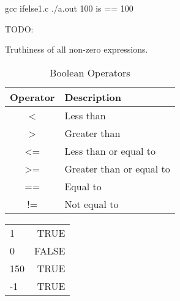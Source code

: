 \begin{Terminal}
gcc ifelse1.c
./a.out
100 is == 100
\end{Terminal}


TODO:

Truthiness of all non-zero expressions.

\begin{table}
\centering
\begin{tabular}{|c|l|}
\hline
Operator & Description \\
\hline
\textless & Less than \\
\textgreater & Greater than \\
\textless= & Less than or equal to \\
\textgreater= & Greater than or equal to \\
== & Equal to \\
!= & Not equal to \\
\hline
\end{tabular}
\caption{Boolean Operators}
\end{table}

\begin{tabular}{l | r}
1 & TRUE \\
0 & FALSE \\
150 & TRUE \\
-1 & TRUE
\end{tabular}
